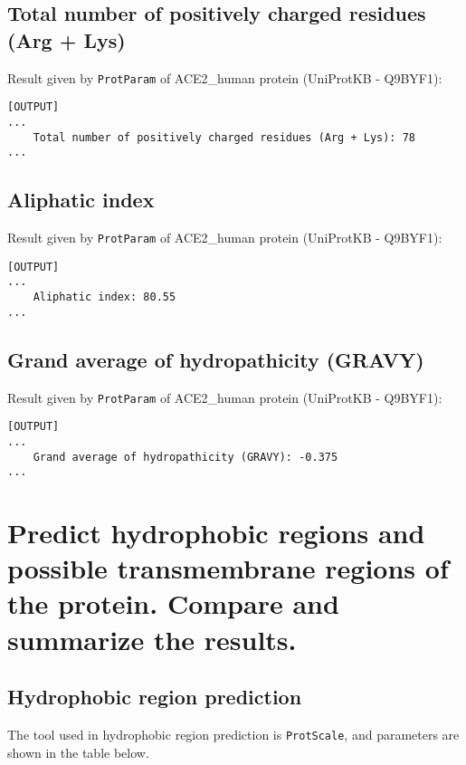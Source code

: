 \documentclass[en,black,10pt,normal]{elegantnote}
\newcommand{\upcite}[1]{\textsuperscript{\textsuperscript{\cite{#1}}}}
\begin{document}
\subsection{Total number of positively charged residues (Arg + Lys)}
Result given by \texttt{ProtParam}\upcite{gasteiger2005protein} of ACE2\_human protein (UniProtKB - Q9BYF1):

\begin{lstlisting}[frame=single]
[OUTPUT]
...
    Total number of positively charged residues (Arg + Lys): 78
...
\end{lstlisting}

\subsection{Aliphatic index}
Result given by \texttt{ProtParam}\upcite{gasteiger2005protein} of ACE2\_human protein (UniProtKB - Q9BYF1):

\begin{lstlisting}[frame=single]
[OUTPUT]
...
    Aliphatic index: 80.55
...
\end{lstlisting}


\subsection{Grand average of hydropathicity (GRAVY)}
Result given by \texttt{ProtParam}\upcite{gasteiger2005protein} of ACE2\_human protein (UniProtKB - Q9BYF1):

\begin{lstlisting}[frame=single]
[OUTPUT]
...
    Grand average of hydropathicity (GRAVY): -0.375
...
\end{lstlisting}


\section{Predict hydrophobic regions and possible transmembrane regions of the protein. Compare and summarize the results.}
\subsection{Hydrophobic region prediction}

The tool used in hydrophobic region prediction is \texttt{ProtScale}\upcite{gasteiger2005protein}, 
and parameters are shown in the table below.
\end{document}
